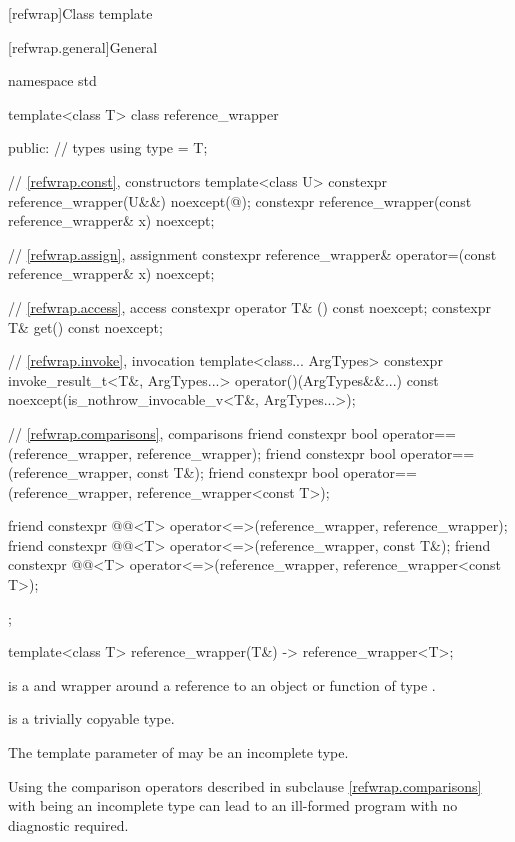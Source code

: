 [refwrap]{Class template }

[refwrap.general]{General}

%
%
\begin{codeblock}
namespace std {
  template<class T> class reference_wrapper {
  public:
    // types
    using type = T;

    // \ref{refwrap.const}, constructors
    template<class U>
      constexpr reference_wrapper(U&&) noexcept(@\seebelow@);
    constexpr reference_wrapper(const reference_wrapper& x) noexcept;

    // \ref{refwrap.assign}, assignment
    constexpr reference_wrapper& operator=(const reference_wrapper& x) noexcept;

    // \ref{refwrap.access}, access
    constexpr operator T& () const noexcept;
    constexpr T& get() const noexcept;

    // \ref{refwrap.invoke}, invocation
    template<class... ArgTypes>
      constexpr invoke_result_t<T&, ArgTypes...> operator()(ArgTypes&&...) const
        noexcept(is_nothrow_invocable_v<T&, ArgTypes...>);

    // \ref{refwrap.comparisons}, comparisons
    friend constexpr bool operator==(reference_wrapper, reference_wrapper);
    friend constexpr bool operator==(reference_wrapper, const T&);
    friend constexpr bool operator==(reference_wrapper, reference_wrapper<const T>);

    friend constexpr @@<T> operator<=>(reference_wrapper, reference_wrapper);
    friend constexpr @@<T> operator<=>(reference_wrapper, const T&);
    friend constexpr @@<T> operator<=>(reference_wrapper,
                                                           reference_wrapper<const T>);
  };

  template<class T>
    reference_wrapper(T&) -> reference_wrapper<T>;
}
\end{codeblock}

\pnum
{} is a  and  wrapper
around a reference to an object or function of type .

\pnum
{} is
a trivially copyable type.

\pnum
The template parameter  of 
may be an incomplete type.
\begin{note}
Using the comparison operators described in subclause \ref{refwrap.comparisons}
with  being an incomplete type
can lead to an ill-formed program
with no diagnostic required.
\end{note}

